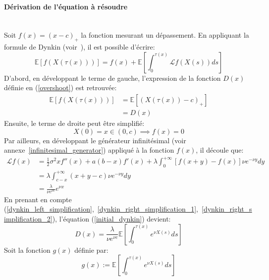 \paragraph{Dérivation de l'équation à résoudre}\phantom{}\\
Soit $f(x)=(x-c)_+$ la fonction mesurant un dépassement. En appliquant la formule de Dynkin (voir~\cite{dynkin1965}), il est possible d'écrire:
\begin{equation}\label{initial_dynkin}
    \mathds{E}[f(X(\tau(x)))]=f(x)+\mathds{E}\left[\int_0^{\tau(x)}\mathcal{L}f(X(s))ds\right]
\end{equation}
D'abord, en développant le terme de gauche, l'expression de la fonction $D(x)$ définie en (\ref{overshoot}) est retrouvée:
\begin{equation}\label{dynkin_left_simplification}
    \begin{aligned}
        \mathds{E}[f(X(\tau(x)))]&=\mathds{E}\left[(X(\tau(x))-c)_+\right]\\
        &=D(x)
    \end{aligned}
\end{equation}
Ensuite, le terme de droite peut être simplifié: 
\begin{equation}\label{dynkin_right_simplification_1}
    X(0)=x\in(0,c)\implies f(x)=0
\end{equation}
Par ailleurs, en développant le générateur infinitésimal (voir annexe~\ref{infinitesimal_generator}) appliqué à la fonction $f(x)$, il découle que:
\begin{equation}\label{dynkin_right_simplification_2}
    \begin{aligned}
        \mathcal{L}f(x)&=\frac{1}{2}\sigma^2xf''(x)+a(b-x)f'(x)+\lambda\int_0^{+\infty}\left[f(x+y)-f(x)\right]\nu e^{-\nu y}dy \\
        &=\lambda\int_{c-x}^{+\infty}(x+y-c)\nu e^{-\nu y}dy \\
        &=\frac{\lambda}{\nu e^{\nu c}}e^{\nu x}
    \end{aligned}
\end{equation}
En prenant en compte (\ref{dynkin_left_simplification},~\ref{dynkin_right_simplification_1},~\ref{dynkin_right_simplification_2}), l'équation (\ref{initial_dynkin}) devient:
\begin{equation}\label{simplified_dynkin}
    D(x)=\frac{\lambda}{\nu e^{\nu c}}\mathds{E}\left[\int_0^{\tau(x)}e^{\nu X(s)}ds\right]
\end{equation}
Soit la fonction $g(x)$ définie par:
\begin{equation}\label{g_defintion}
    g(x):=\mathds{E}\left[\int_0^{\tau(x)}e^{\nu X(s)}ds\right]
\end{equation}
